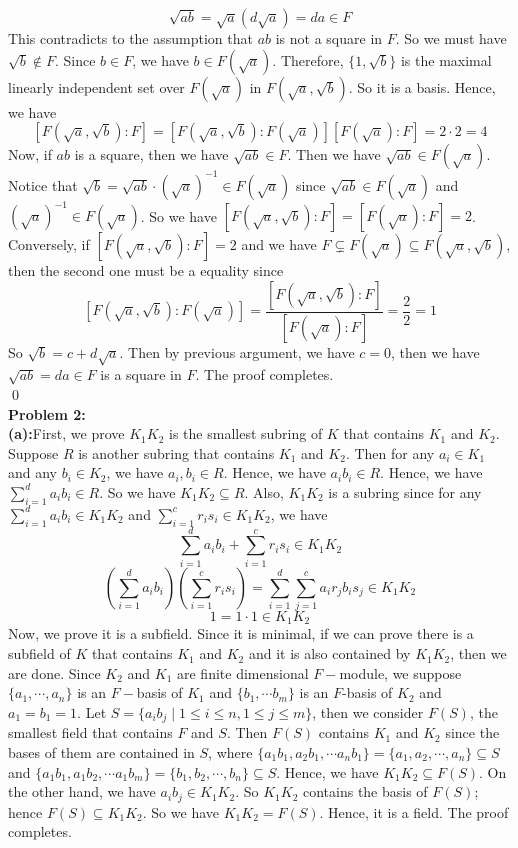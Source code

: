 \documentclass[12pt]{amsart}
\begin{document}
\[\sqrt{ab}=\sqrt{a}(d\sqrt{a})=da\in F\]
This contradicts to the assumption that $ab$ is not a square in $F$. So we must have $\sqrt{b}\notin F$. Since $b\in F$, we have $b\in F(\sqrt{a})$. Therefore, $\{1,\sqrt{b}\}$ is the maximal linearly independent set over $F(\sqrt{a})$ in $F(\sqrt{a},\sqrt{b})$. So it is a basis. Hence, we have 
\[[F(\sqrt{a},\sqrt{b}):F]=[F(\sqrt{a},\sqrt{b}):F(\sqrt{a})][F(\sqrt{a}):F]=2\cdot 2=4\]
\linebreak
Now, if $ab$ is a square, then we have $\sqrt{ab}\in F$. Then we have $\sqrt{ab}\in F(\sqrt{a})$. Notice that $\sqrt{b}=\sqrt{ab}\cdot (\sqrt{a})^{-1}\in F(\sqrt{a})$ since $\sqrt{ab}\in F(\sqrt{a})$ and $(\sqrt{a})^{-1}\in F(\sqrt{a})$. So we have $[F(\sqrt{a},\sqrt{b}):F]=[F(\sqrt{a}):F]=2$. Conversely, if $[F(\sqrt{a},\sqrt{b}):F]=2$ and we have $F\subsetneq F(\sqrt{a})\subseteq F(\sqrt{a},\sqrt{b})$, then the second one must be a equality since 
\[[F(\sqrt{a},\sqrt{b}):F(\sqrt{a})]=\frac{[F(\sqrt{a},\sqrt{b}):F]}{[F(\sqrt{a}):F]}=\frac{2}{2}=1\]
So $\sqrt{b}=c+d\sqrt{a}$. Then by previous argument, we have $c=0$, then we have $\sqrt{ab}=da\in F$ is a square in $F$. The proof completes.
\\\qed\\
\textbf{Problem 2:} \\
\textbf{(a):}First, we prove $K_1K_2$ is the smallest subring of $K$ that contains $K_1$ and $K_2$. Suppose $R$ is another subring that contains $K_1$ and $K_2$. Then for any $a_i\in K_1$ and any $b_i\in K_2$, we have $a_i,b_i\in R$. Hence, we have $a_ib_i\in R$. Hence, we have $\sum_{i=1}^da_ib_i\in R$. So we have $K_1K_2\subseteq R$. Also, $K_1K_2$ is a subring since for any $\sum_{i=1}^d a_ib_i\in K_1K_2$ and $\sum_{i=1}^c r_is_i\in K_1K_2$, we have 
\[\sum_{i=1}^d a_ib_i+\sum_{i=1}^c r_is_i\in K_1K_2\]
\[(\sum_{i=1}^d a_ib_i)(\sum_{i=1}^c r_is_i)=\sum_{i=1}^d\sum_{j=1}^ca_ir_jb_is_j\in K_1K_2\]
\[1=1\cdot 1\in K_1K_2\]
Now, we prove it is a subfield. Since it is minimal, if we can prove there is a subfield of $K$ that contains $K_1$ and $K_2$ and it is also contained by $K_1K_2$, then we are done. Since $K_2$ and $K_1$ are finite dimensional $F-$module, we suppose $\{a_1,\cdots,a_n\}$ is an $F-$basis of $K_1$ and $\{b_1,\cdots b_m\}$ is an $F$-basis of $K_2$ and $a_1=b_1=1$. Let $S=\{a_ib_j\mid 1\leq i \leq n, 1\leq j\leq m \}$, then we consider $F(S)$, the smallest field that contains $F$ and $S$. Then $F(S)$ contains $K_1$ and $K_2$ since the bases of them are contained in $S$, where $\{a_1b_1,a_2b_1,\cdots a_nb_1\}=\{a_1,a_2,\cdots, a_n\}\subseteq S$ and $\{a_1b_1,a_1b_2,\cdots a_1b_m\}=\{b_1,b_2,\cdots,b_n\}\subseteq S$. Hence, we have $K_1K_2\subseteq F(S)$. On the other hand, we have $a_ib_j\in K_1K_2$. So $K_1K_2$ contains the basis of $F(S)$; hence $F(S)\subseteq K_1K_2$. So we have $K_1K_2=F(S)$. Hence, it is a field. The proof completes.\\
\end{document}
